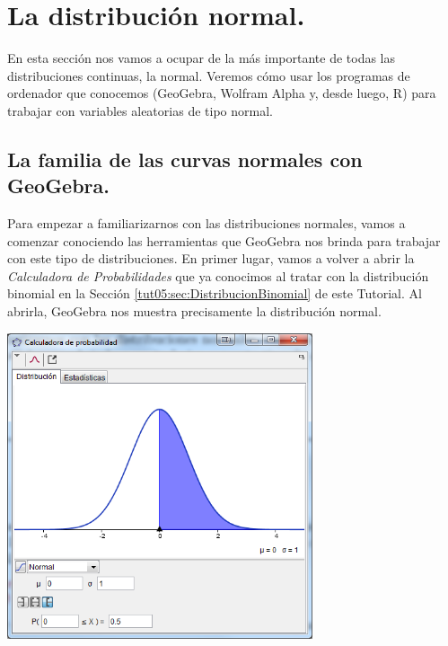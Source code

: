 \documentclass[10pt,a4paper]{article}\usepackage[]{graphicx}\usepackage[]{color}
\newcounter{cont01}
\begin{document}
\section{La distribución normal.}
\label{tut05:sec:DistribucionNormal}

En esta sección nos vamos a ocupar de la más importante de todas las distribuciones continuas, la normal. Veremos cómo usar los programas de ordenador que conocemos (GeoGebra, Wolfram Alpha y, desde luego, R) para trabajar con variables aleatorias de tipo normal.

\subsection{La familia de las curvas normales con GeoGebra.}

Para empezar a familiarizarnos con las distribuciones normales, vamos a comenzar conociendo las herramientas que GeoGebra nos brinda para trabajar con este tipo de distribuciones. En primer lugar, vamos a volver a abrir la {\em Calculadora de Probabilidades} que ya conocimos al tratar con la distribución binomial en la Sección \ref{tut05:sec:DistribucionBinomial} de este Tutorial. Al abrirla, GeoGebra nos muestra precisamente la distribución normal.

\begin{center}
    \includegraphics[width=9cm]{../fig/Tut05-59.png}
\end{center}
\end{document}
